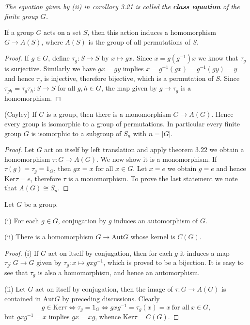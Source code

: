 \begin{note}\em
The equation given by (ii) in corollary 3.21 is called the \textbf{class equation} of the finite group $G$.
\end{note}
\begin{theorem}
If a group $G$ acts on a set $S$, then this action induces a homomorphism $G\to A(S)$, where $A(S)$ is the group of all permutations of $S$.
\end{theorem}
\begin{proof}
If $g\in G$, define $\tau_g:S\to S$ by $x\mapsto gx$. Since $x=g(g^{-1})x$ we know that $\tau_g$ is surjective. Similarly we have $gx=gy$ implies $x=g^{-1}(gx)=g^{-1}(gy)=y$ and hence $\tau_g$ is injective, therefore bijective, which is a permutation of $S$. Since $\tau_{gh}=\tau_g\tau_h:S\to S$ for all $g,h\in G$, the map given by $g\mapsto\tau_g$ is a homomorphism.
\end{proof}
\begin{corollary}(Cayley)
If $G$ is a group, then there is a monomorphism $G\to A(G)$. Hence every group is isomorphic to a group of permutations. In particular every finite group $G$ is isomorphic to a subgroup of $S_n$ with $n=|G|$.
\end{corollary}
\begin{proof}
Let $G$ act on itself by left translation and apply theorem 3.22 we obtain a homomorphism $\tau:G\to A(G)$. We now show it is a monomorphism. If $\tau(g)=\tau_g=1_G$, then $gx=x$ for all $x\in G$. Let $x=e$ we obtain $g=e$ and hence $\mathrm{Ker}\tau=e$, therefore $\tau$ is a monomorphism. To prove the last statement we note that $A(G)\cong S_n$.
\end{proof}
\begin{corollary}
Let $G$ be a group.\par
(i) For each $g\in G$, conjugation by $g$ induces an automorphism of $G$.\par
(ii) There is a homomorphism $G\to\mathrm{Aut}G$ whose kernel is $C(G)$.
\end{corollary}
\begin{proof}
(i) If $G$ act on itself by conjugation, then for each $g$ it induces a map $\tau_g:G\to G$ given by $\tau_g:x\mapsto gxg^{-1}$, which is proved to be a bijection. It is easy to see that $\tau_g$ is also a homomorphism, and hence an automorphism.\par
(ii) Let $G$ act on itself by conjugation, then the image of $\tau:G\to A(G)$ is contained in $\mathrm{Aut}G$ by preceding discussions. Clearly 
$$g\in\mathrm{Ker}\tau\Leftrightarrow\tau_g=1_G\Leftrightarrow gxg^{-1}=\tau_g(x)=x\ \text{for all}\ x\in G,$$
but $gxg^{-1}=x$ implies $gx=xg$, whence $\mathrm{Ker}\tau=C(G)$.
\end{proof}
